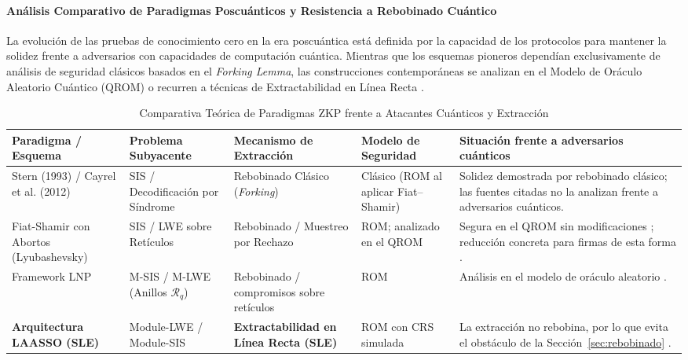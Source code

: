 \paragraph{Análisis Comparativo de Paradigmas Poscuánticos y Resistencia a Rebobinado Cuántico}
La evolución de las pruebas de conocimiento cero en la era poscuántica está definida por la capacidad de los protocolos para mantener la solidez frente a adversarios con capacidades de computación cuántica. Mientras que los esquemas pioneros dependían exclusivamente de análisis de seguridad clásicos basados en el \textit{Forking Lemma}, las construcciones contemporáneas se analizan en el Modelo de Oráculo Aleatorio Cuántico (QROM) o recurren a técnicas de Extractabilidad en Línea Recta \cite{liu2019revisiting, ma2026laasso}.

\begin{table}[h!]
\centering
\small
\caption{Comparativa Teórica de Paradigmas ZKP frente a Atacantes Cuánticos y Extracción}
\label{tab:zkp_quantum_comparison}
\begin{tabular}{|p{3.2cm}|p{2.8cm}|p{3.2cm}|p{2.2cm}|p{3.2cm}|}
\hline
\textbf{Paradigma / Esquema} & \textbf{Problema Subyacente} & \textbf{Mecanismo de Extracción} & \textbf{Modelo de Seguridad} & \textbf{Situación frente a adversarios cuánticos} \\ \hline
Stern (1993) / Cayrel et al. (2012) \cite{cayrel2012improved} & SIS / Decodificación por Síndrome & Rebobinado Clásico (\textit{Forking}) & Clásico (ROM al aplicar Fiat--Shamir) & Solidez demostrada por rebobinado clásico; las fuentes citadas no la analizan frente a adversarios cuánticos. \\ \hline
Fiat-Shamir con Abortos (Lyubashevsky) \cite{lyubashevsky2012lattice} & SIS / LWE sobre Retículos & Rebobinado / Muestreo por Rechazo & ROM; analizado en el QROM & Segura en el QROM sin modificaciones \cite{liu2019revisiting}; reducción concreta para firmas de esta forma \cite{kiltz2018concrete}. \\ \hline
Framework LNP \cite{lyubashevsky2022lattice} & M-SIS / M-LWE (Anillos $\mathcal{R}_q$) & Rebobinado / compromisos sobre retículos & ROM & Análisis en el modelo de oráculo aleatorio \cite{lyubashevsky2022lattice}. \\ \hline
\textbf{Arquitectura LAASSO (SLE)} \cite{ma2026laasso} & Module-LWE / Module-SIS & \textbf{Extractabilidad en Línea Recta (SLE)} & ROM con CRS simulada & La extracción no rebobina, por lo que evita el obstáculo de la Sección~\ref{sec:rebobinado} \cite{ma2026laasso}. \\ \hline
\end{tabular}
\end{table}

